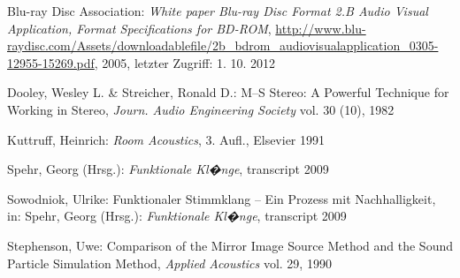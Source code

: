 \begin{thebibliography}{}

Blu-ray Disc Association: 
\emph{White paper Blu-ray Disc Format 2.B Audio Visual Application, Format Specifications for BD-ROM}, 
\url{http://www.blu-raydisc.com/Assets/downloadablefile/2b_bdrom_audiovisualapplication_0305-12955-15269.pdf}, 2005, letzter Zugriff: 1. 10. 2012

Dooley, Wesley L.  \& Streicher, Ronald D.:
\glqq M--S Stereo: A Powerful Technique for Working in Stereo\grqq, 
\emph{Journ. Audio Engineering Society} vol. 30 (10), 1982

Kuttruff, Heinrich: 
\emph{Room Acoustics}, 3. Aufl., Elsevier 1991

Spehr, Georg (Hrsg.): 
\emph{Funktionale Kl�nge}, transcript 2009

Sowodniok, Ulrike: 
\glqq Funktionaler Stimmklang -- Ein Prozess mit Nachhalligkeit\grqq, 
in: Spehr, Georg (Hrsg.): \emph{Funktionale Kl�nge}, transcript 2009

Stephenson, Uwe: 
\glqq Comparison of the Mirror Image Source Method and the Sound Particle Simulation Method\grqq, 
\emph{Applied Acoustics} vol. 29, 1990


\end{thebibliography}

\clearpage\thispagestyle{empty}
\eigen  %












